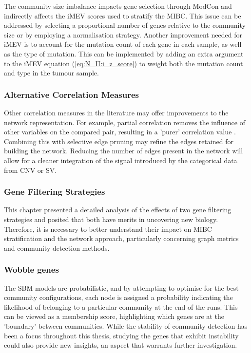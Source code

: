The community size imbalance impacts gene selection through ModCon and indirectly affects the iMEV scores used to stratify the MIBC. This issue can be addressed by selecting a proportional number of genes relative to the community size or by employing a normalisation strategy. Another improvement needed for iMEV is to account for the mutation count of each gene in each sample, as well as the type of mutation. This can be implemented by adding an extra argument to the iMEV equation (\cref{eq:N_II:i_z_score}) to weight both the mutation count and type in the tumour sample.


\subsubsection*{Alternative Correlation Measures}

Other correlation measures in the literature may offer improvements to the network representation. For example, partial correlation removes the influence of other variables on the compared pair, resulting in a 'purer' correlation value \citep{De_la_Fuente2004-ts}. Combining this with selective edge pruning may refine the edges retained for building the network. Reducing the number of edges present in the network will allow for a cleaner integration of the signal introduced by the categorical data from CNV or SV.

\subsubsection*{Gene Filtering Strategies}

This chapter presented a detailed analysis of the effects of two gene filtering strategies and posited that both have merits in uncovering new biology. Therefore, it is necessary to better understand their impact on MIBC stratification and the network approach, particularly concerning graph metrics and community detection methods. 

\subsubsection*{Wobble genes}

The SBM models are probabilistic, and by attempting to optimise for the best community configurations, each node is assigned a probability indicating the likelihood of belonging to a particular community at the end of the runs. This can be viewed as a membership score, highlighting which genes are at the 'boundary' between communities. While the stability of community detection has been a focus throughout this thesis, studying the genes that exhibit instability could also provide new insights, an aspect that warrants further investigation.


